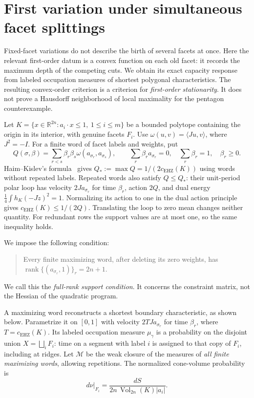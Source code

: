 \section{First variation under simultaneous facet splittings}
\label{sec:multicut-variation}

Fixed-facet variations do not describe the birth of several facets at once.
Here the relevant first-order datum is a convex function on each old facet:
it records the maximum depth of the competing cuts. We obtain its exact
capacity response from labeled occupation measures of shortest polygonal
characteristics. The resulting convex-order criterion is a criterion for
\emph{first-order stationarity}. It does not prove a Hausdorff neighborhood
of local maximality for the pentagon counterexample.

Let $K=\{x\in\mathbb R^{2n}:a_i\cdot x\leq1,\ 1\leq i\leq m\}$
be a bounded polytope containing the origin in its interior, with genuine
facets $F_i$. Use $\omega(u,v)=\langle Ju,v\rangle$, where $J^2=-I$.
For a finite word of facet labels and weights, put
\begin{equation}\label{eq:mc-word}
 Q(\sigma,\beta)=\sum_{r<s}\beta_r\beta_s
 \omega(a_{\sigma_r},a_{\sigma_s}),\qquad
 \sum_r\beta_ra_{\sigma_r}=0,\quad
 \sum_r\beta_r=1,\quad\beta_r\geq0.
\end{equation}
Haim--Kislev's formula~\cite{HK2017} gives
$Q_*:=\max Q=1/(2c_{\mathrm{EHZ}}(K))$ using words without repeated labels.
Repeated words also satisfy $Q\leq Q_*$: their unit-period polar loop has
velocity $2Ja_{\sigma_r}$ for time $\beta_r$, action $2Q$, and dual energy
$\frac14\int h_K(-J\dot z)^2=1$. Normalizing its action to one in the dual
action principle gives $c_{\mathrm{EHZ}}(K)\leq1/(2Q)$. Translating the loop
to zero mean changes neither quantity. For redundant rows the support values
are at most one, so the same inequality holds.

We impose the following condition:
\begin{quote}
Every finite maximizing word, after deleting its zero weights, has
$\operatorname{rank}\{(a_{\sigma_r},1)\}_r=2n+1$.
\end{quote}
We call this the \emph{full-rank support condition}. It concerns the constraint
matrix, not the Hessian of the quadratic program.

A maximizing word reconstructs a shortest boundary characteristic, as shown
below. Parametrize it on $[0,1]$ with velocity $2TJ a_{\sigma_r}$ for time
$\beta_r$, where $T=c_{\mathrm{EHZ}}(K)$. Its labeled occupation measure
$\mu_\gamma$ is a probability on the disjoint union
$X=\bigsqcup_iF_i$: time on a segment with label $i$ is assigned to that
copy of $F_i$, including at ridges. Let $\mathcal M$ be the weak closure of
the measures of \emph{all finite maximizing words}, allowing repetitions.
The normalized cone-volume probability is
\begin{equation}\label{eq:mc-nu}
 d\nu|_{F_i}=\frac{dS}{2n\,\operatorname{Vol}_{2n}(K)|a_i|}.
\end{equation}

